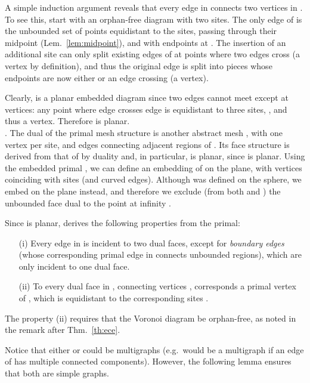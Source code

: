 \documentclass[11pt]{article}
\begin{document}
A simple induction argument reveals that every edge in  connects two
vertices in . 
To see this, start with an orphan-free diagram with two sites. The only edge
of  is the unbounded set of points equidistant to the sites, passing through
their midpoint (Lem.~\ref{lem:midpoint}), and with endpoints at . 
The insertion of an additional site can only split existing edges of
 at points
where two edges cross (a vertex by definition), and thus the
original edge is split into pieces whose endpoints are now either  or 
an edge crossing (a vertex). 



Clearly,  is a planar embedded diagram since two edges cannot meet except at vertices:  
any point  where edge  crosses 
edge  is equidistant to three sites, , and thus a vertex. 
Therefore  is planar. \\









.
The dual of the primal  mesh structure  is another abstract 
mesh , with one vertex per site, 
and edges connecting adjacent regions of . Its face structure is derived from that of  by duality   and, in particular,  is planar, since  is planar. 
Using the embedded primal , we can define an embedding  of  
on the plane, with vertices coinciding with sites (and curved edges). 
Although  was defined on the sphere, we embed  on
the plane instead, and therefore we exclude (from both  and ) the unbounded face dual to the point at infinity . 

Since  is planar, 
 derives the following properties from the primal:
\begin{itemize}
\item[(i)]Every edge in  is incident to two dual faces, 
except for \emph{boundary edges} (whose corresponding primal edge in
 connects unbounded regions), which are only incident to one dual face. 
\item[(ii)]To every dual face in , connecting vertices , corresponds a
primal vertex  of , 
which is equidistant to the corresponding sites . 
\end{itemize}
The property (ii) requires that the Voronoi diagram be orphan-free, as noted in the remark after Thm.~\ref{th:ece}. 




Notice that either  or  could be multigraphs (e.g.\  would be a multigraph if an edge  of  has multiple connected components). 
However, the following lemma ensures that both are simple graphs. 
\end{document}
